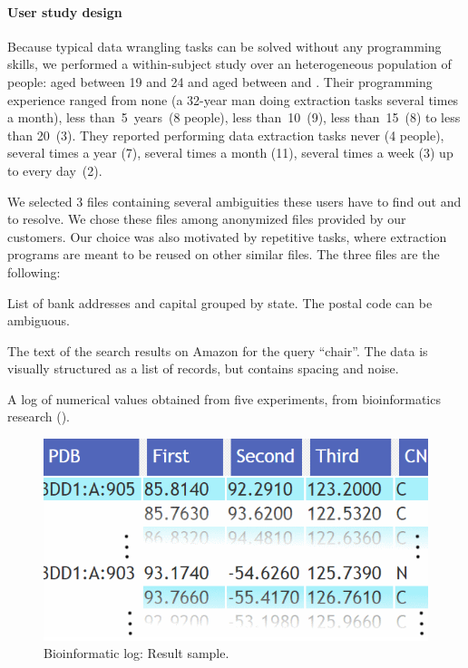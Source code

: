 \paragraph{User study design}
Because typical data wrangling tasks can be solved without any programming skills, we performed a
within-subject study over an heterogeneous population of \numPeopleSurvey{} people: 
aged between 19 and 24 and  aged between \minAge{} and \maxAge{}.
Their programming experience ranged from none (a 32-year man doing extraction tasks several
times a month), less than~5~years~(8 people), less than~10~(9), less than~15~(8) to less than 20~(3).
They reported performing data extraction tasks never (4 people), several times a year (7),
several times a month (11), several times a week (3) up to every day~(2).

We selected 3 files containing several ambiguities these users have to find out and to resolve.
We chose these files among anonymized files provided by our customers.
Our choice was also motivated by repetitive tasks, where extraction programs are meant to be
reused on other similar files.
The three files are the following:

\newcommand{\BankListing}{Bank listing}
\newcommand{\AmazonListing}{Amazon research}
\newcommand{\HydrogensListing}{Bioinformatic log}
\begin{description}[nosep]
    \item[1. \BankListing.] List of bank addresses and capital grouped by state.
        The postal code can be ambiguous.
    \item[2. Amazon research.] The text of the search results on Amazon for the query ``chair''.
        The data is visually structured as a list of records, but contains spacing and noise.
    \item[3. Bioinformatic log.] A log of numerical values obtained from five experiments, from bioinformatics
        research ().
\end{description}

\begin{figure}[t]
    \centering
    \includegraphics[width=0.6\columnwidth]{figures/hinthydrogens}
    \caption{Bioinformatic log: Result sample.}
    \label{fig:interactive:evaluation:biosample}
\end{figure}

